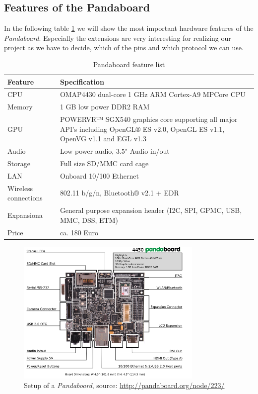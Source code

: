 \newpage
\subsection{Features of the Pandaboard}
In the following table \ref{tab:pandaBoardTable} we will show the most important hardware features of the \textit{Pandaboard}. Especially the extensions are very interesting for realizing our project as we have to decide, which of the pins and which protocol we can use.

\begin{table}[h]
\centering
\begin{tabular}{| l |  p{7cm} |}
\hline
\textbf{Feature} & \textbf{Specification} \\ \hline
CPU & OMAP4430 dual-core 1 GHz ARM Cortex-A9 MPCore CPU \\ \hline
Memory & 1 GB low power DDR2 RAM \\ \hline
GPU & POWERVR™ SGX540 graphics core supporting all major API's including OpenGL® ES v2.0, OpenGL ES v1.1, OpenVG v1.1 and EGL v1.3 \\ \hline
Audio & Low power audio, 3.5"  Audio in/out \\ \hline
Storage & Full size SD/MMC card cage \\ \hline
LAN & Onboard 10/100 Ethernet \\ \hline
Wireless connections & 802.11 b/g/n, Bluetooth® v2.1 + EDR \\ \hline
Expansiona & General purpose expansion header (I2C, SPI, GPMC, USB, MMC, DSS, ETM) \\ \hline
Price & ca. 180 Euro \\
\hline
\end{tabular}
\caption{Pandaboard feature list}
\label{tab:pandaBoardTable}
\end{table}

\begin{figure}[H]
   \centering
   \includegraphics[width=0.8\textwidth]{img/Pandaboard_Setup.png}%
   \caption{Setup of a \textit{Pandaboard},  source: \url{http://pandaboard.org/node/223/}}
   \label{fig:pandaBoard_Setup}%
\end{figure}

